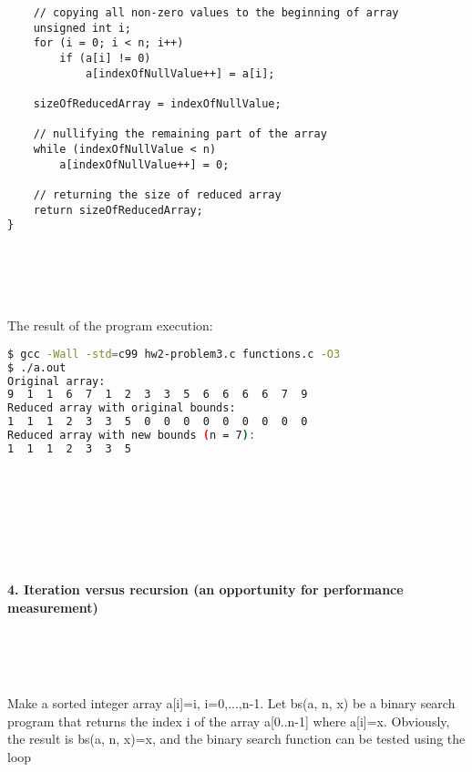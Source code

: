 \documentclass{article}
\begin{document}
\begin{verbatim}
    // copying all non-zero values to the beginning of array
    unsigned int i;
    for (i = 0; i < n; i++)
        if (a[i] != 0)
            a[indexOfNullValue++] = a[i];

    sizeOfReducedArray = indexOfNullValue;

    // nullifying the remaining part of the array
    while (indexOfNullValue < n)
        a[indexOfNullValue++] = 0;

    // returning the size of reduced array
    return sizeOfReducedArray;
}
		\end{verbatim}
		
\paragraph{}\
\paragraph{}\
		
		\rmfamily
		\noindent The result of the program execution:
		
		\ttfamily
		\begin{lstlisting}[language=bash]
$ gcc -Wall -std=c99 hw2-problem3.c functions.c -O3
$ ./a.out
Original array:
9  1  1  6  7  1  2  3  3  5  6  6  6  6  7  9
Reduced array with original bounds:
1  1  1  2  3  3  5  0  0  0  0  0  0  0  0  0
Reduced array with new bounds (n = 7):
1  1  1  2  3  3  5
		\end{lstlisting}
		
\paragraph{}\	
\paragraph{}\
\paragraph{}\

	\rmfamily
	
	\paragraph{4. Iteration versus recursion (an opportunity for performance measurement) }\
	
	\rmfamily\
	
		Make a sorted integer array a[i]=i, i=0,...,n-1.  Let bs(a, n, x) be a binary search program that returns the index i of the array a[0..n-1] where a[i]=x. Obviously, the result is bs(a, n, x)=x, and the binary search function can be tested using the loop
		
\end{document}
